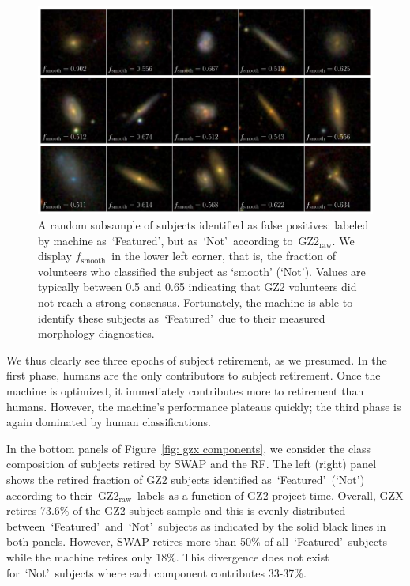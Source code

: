 \documentclass[twocolumn]{aastex6}
\newcommand{\feat}{`Featured'}
\newcommand{\notfeat}{`Not'}
\newcommand{\raw}{GZ2$_{\text{raw}}$}
\newcommand{\fsmooth}{$f_{\mathrm{smooth}}$}
\begin{document}
\begin{figure}[t!]
\centering
\includegraphics[width=6.5in]{f9.pdf}
\caption{A random subsample of subjects identified as false positives: labeled by machine as~\feat, but as~\notfeat~according to~\raw. We display \fsmooth~in the lower left corner, that is, the fraction of volunteers who classified the subject as `smooth' (\notfeat). Values are typically between 0.5 and 0.65 indicating that GZ2 volunteers did not reach a strong consensus. Fortunately, the machine is able to identify these subjects as~\feat~due to their measured morphology diagnostics. \label{fig: machine false pos}}
\end{figure}

We thus clearly see three epochs of subject retirement, as we presumed.
In the first phase, humans are the only contributors to subject retirement.  
Once the machine is optimized, it immediately contributes more to retirement than humans.
However, the machine's performance plateaus quickly;  the third 
phase is again dominated by human classifications.

In the bottom panels of Figure~\ref{fig: gzx components}, we consider the class
composition of subjects retired by SWAP and the RF. 
The left (right) panel shows the retired fraction of GZ2 subjects identified 
as~\feat~(\notfeat) according to their~\raw~labels as a function of GZ2 project time. 
Overall, GZX retires 73.6\% of the GZ2 subject sample and this is evenly 
distributed between~\feat~and~\notfeat~subjects as indicated by the solid
black lines in both panels. 
However, SWAP retires more than 50\% of all~\feat~subjects while the machine
retires only 18\%. This divergence does not exist for~\notfeat~subjects where
each component contributes 33-37\%. 
\end{document}
